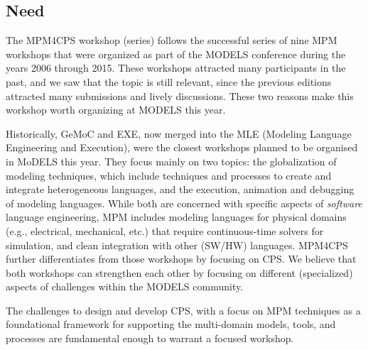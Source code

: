 \subsection{Need}
The MPM4CPS workshop (series) follows the successful series of nine MPM workshops that 
were organized as part of the MODELS conference during the years 2006 through 2015.
These workshops attracted many participants in the past, and we saw that the topic
is still relevant, since the previous editions attracted many submissions and lively discussions.
These two reasons make this workshop worth organizing at MODELS this year.

Historically, GeMoC and EXE, now merged into the MLE (Modeling Language 
Engineering and Execution), were the closest workshops planned to be organised 
in MoDELS this year. They focus mainly on two topics: the globalization of
modeling techniques, which include techniques and processes to create and
integrate heterogeneous languages, and the execution, animation and debugging
of modeling languages. While both are concerned with specific aspects of 
\emph{software} language engineering, MPM includes modeling languages for 
physical domains (e.g., electrical, mechanical, etc.) that require 
continuous-time solvers for simulation, and clean integration with other (SW/HW) 
languages.
MPM4CPS further differentiates from those workshops by focusing on CPS. 
We believe that both workshops can strengthen each other by focusing on different 
(specialized) aspects of challenges within the MODELS community.


The challenges to design and develop CPS, with a focus on MPM techniques as a 
foundational framework for supporting the multi-domain models, tools, and 
processes are fundamental enough to warrant a focused workshop.

